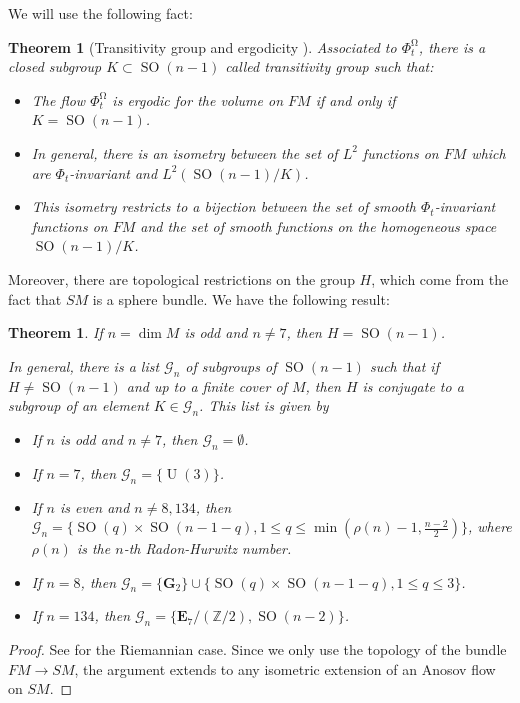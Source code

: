 \documentclass[12pt]{amsart}
\numberwithin{numbering}{section}
\theoremstyle{plain}
\newtheorem{thm}[numbering]{Theorem}
\theoremstyle{definition}
\theoremstyle{remark}
\numberwithin{equation}{section}
\DeclareMathOperator{\SO}{SO}
\DeclareMathOperator{\U}{U}
\DeclareMathOperator{\mg}{\Omega}
\newcommand{\Z}{\mathbb{Z}}
\begin{document}
We will use the following fact:

\begin{thm}[Transitivity group and ergodicity {\cite{lef2023isometric}}] \label{thm:transitivity_group}
Associated to $\Phi_t^{\mg}$, there is a closed subgroup $K \subset \SO(n-1)$ called \emph{transitivity group} such that:
\begin{itemize}
\item The flow $\Phi_t^{\mg}$ is ergodic for the volume on $FM$ if and only if $K = \SO(n-1)$.
\item In general, there is an isometry between the set of $L^2$ functions on $FM$ which are $\Phi_t$-invariant and $L^2(\SO(n-1)/K)$.
\item This isometry restricts to a bijection between the set of smooth $\Phi_t$-invariant functions on $FM$ and the set of smooth functions on the homogeneous space $\SO(n-1)/K$.
\end{itemize}
\end{thm}

Moreover, there are topological restrictions on the group $H$, which come from the fact that $SM$ is a sphere bundle. We have the following result:

\begin{thm} \label{thm:list_groups}
If $n = \dim M$ is odd and $n \neq 7$, then $H = \SO(n-1)$.

In general, there is a list $\mathcal{G}_n$ of subgroups of $\SO(n-1)$ such that if $H \neq \SO(n-1)$ and up to a finite cover of $M$, then $H$ is conjugate to a subgroup of an element $K \in \mathcal{G}_n$. This list is given by 
\begin{itemize}
\item If $n$ is odd and $n \neq 7$, then $\mathcal{G}_n = \emptyset$.
\item If $n = 7$, then $\mathcal{G}_n = \{ \U(3) \}$.
\item If $n$ is even and $n \neq 8, 134$, then $\mathcal{G}_n = \{\SO(q) \times \SO(n-1-q), 1 \leq q \leq \min(\rho(n) - 1, \frac{n-2}{2}) \}$, where $\rho(n)$ is the $n$-th Radon-Hurwitz number.
\item If $n = 8$, then $\mathcal{G}_n = \{ \mathbf{G}_2 \} \cup \{\SO(q) \times \SO(n-1-q), 1 \leq q \leq 3 \}$.
\item If $n = 134$, then $\mathcal{G}_n = \{ \mathbf{E}_7/(\Z/2), \SO(n-2)\}$.
\end{itemize}
\end{thm}

\begin{proof}
See {\cite[Theorem 3.8]{cekic2024frame}} for the Riemannian case. Since we only use the topology of the bundle $FM \to SM$, the argument extends to any isometric extension of an Anosov flow on $SM$.
\end{proof}
\end{document}
